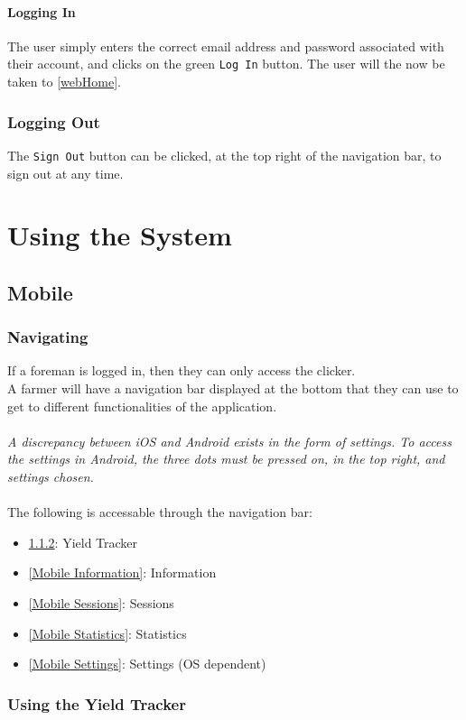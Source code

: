 \documentclass[11pt]{article}
\begin{document}
\paragraph{Logging In}The user simply enters the correct email address and password associated with their account, and clicks on the green \texttt{Log In} button. The user will the now be taken to \ref{webHome}.

\subsubsection{Logging Out}
\label{webLoggingOut}
The \texttt{Sign Out} button can be clicked, at the top right of the navigation bar, to sign out at any time.

\newpage
\section{Using the System}

\subsection{Mobile}
\subsubsection{Navigating}
If a foreman is logged in, then they can only access the clicker.\\
A farmer will have a navigation bar displayed at the bottom that they can use to get to different functionalities of the application.\\
\\
\textit{A discrepancy between iOS and Android exists in the form of settings. To access the settings in Android, the three dots must be pressed on, in the top right, and settings chosen.}\\
\\
The following is accessable through the navigation bar:
\begin{itemize}
\item \ref{Mobile Yield Tracker}: Yield Tracker
\item \ref{Mobile Information}: Information
\item \ref{Mobile Sessions}: Sessions 
\item \ref{Mobile Statistics}: Statistics
\item \ref{Mobile Settings}: Settings (OS dependent)
\end{itemize}
\subsubsection{Using the Yield Tracker}
\label{Mobile Yield Tracker}
\end{document}
